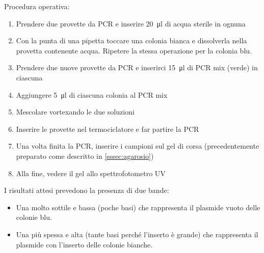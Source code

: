\noindent Procedura operativa:
\begin{enumerate}
	\item Prendere due provette da PCR e inserire \qty{20}{\micro\litre} di acqua sterile in ognuna
	\item Con la punta di una pipetta toccare una colonia bianca e dissolverla nella provetta contenente acqua. Ripetere la stessa operazione per la colonia blu.
	\item Prendere due nuove provette da PCR e inserirci \qty{15}{\micro\litre} di PCR mix (verde) in ciascuna
	\item Aggiungere \qty{5}{\micro\litre} di ciascuna colonia al PCR mix
	\item Mescolare vortexando le due soluzioni
	\item Inserire le provette nel termociclatore e far partire la PCR
	\item Una volta finita la PCR, inserire i campioni sul gel di corsa (precedentemente preparato come descritto in \ref{sssec:agarosio})
	\item Alla fine, vedere il gel allo spettrofotometro UV
\end{enumerate}

\noindent I risultati attesi prevedono la presenza di due bande:
\begin{itemize}
	\item Una molto sottile e bassa (poche basi) che rappresenta il plasmide vuoto delle colonie blu.
	\item Una più spessa e alta (tante basi perché l’inserto è grande) che rappresenta il plasmide con l’inserto delle colonie bianche.
\end{itemize}
